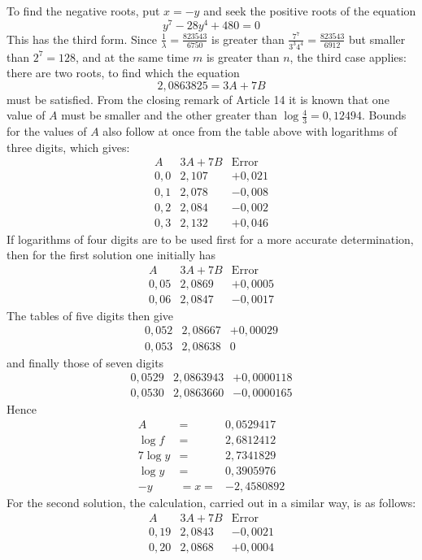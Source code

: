 To find the negative roots, put $x=-y$ and seek the positive roots of the equation
\[
y^{7}-28y^{4}+480=0
\]
This has the third form. Since $\frac{1}{\lambda}=\frac{823543}{6750}$ is greater than $\frac{7^{7}}{3^{3}4^{4}}=\frac{823543}{6912}$ but smaller than $2^{7}=128$, and at the same time $m$ is greater than $n$, the third case applies: there are two roots, to find which the equation
\[
2{,}0863825=3A+7B
\]
must be satisfied. From the closing remark of Article 14 it is known that one value of $A$ must be smaller and the other greater than $\log\frac{4}{3}=0{,}12494$. Bounds for the values of $A$ also follow at once from the table above with logarithms of three digits, which gives:
\[
\begin{array}{c|c|r}
A&3A+7B&\mbox{Error}\\ \hline
0{,}0&2{,}107&+0{,}021\\
0{,}1&2{,}078&-0{,}008\\
0{,}2&2{,}084&-0{,}002\\
0{,}3&2{,}132&+0{,}046
\end{array}
\]
If logarithms of four digits are to be used first for a more accurate determination, then for the first solution one initially has
\[
\begin{array}{r|r|r}
A&3A+7B&\mathrm{Error}\\\hline
0{,}05&2{,}0869&+0{,}0005\\
0{,}06&2{,}0847&-0{,}0017
\end{array}
\]
The tables of five digits then give
\[
\begin{array}{r|r|r}
0{,}052&2{,}08667&+0{,}00029\\
0{,}053&2{,}08638&0
\end{array}
\]
and finally those of seven digits
\[
\begin{array}{r|r|r}
0{,}0529&2{,}0863943&+0{,}0000118\\
0{,}0530&2{,}0863660&-0{,}0000165
\end{array}
\]
Hence
\[
\begin{array}{rcl}
A&=&0{,}0529417\\
\log f&=&2{,}6812412\\
7\log y&=&2{,}7341829\\
\log y&=&0{,}3905976\\
-y&=x=&-2{,}4580892
\end{array}
\]
For the second solution, the calculation, carried out in a similar way, is as follows:
\[
\begin{array}{r|r|r}
A&3A+7B&\mathrm{Error}\\\hline
0{,}19&2{,}0843&-0{,}0021\\
0{,}20&2{,}0868&+0{,}0004
\end{array}
\]
